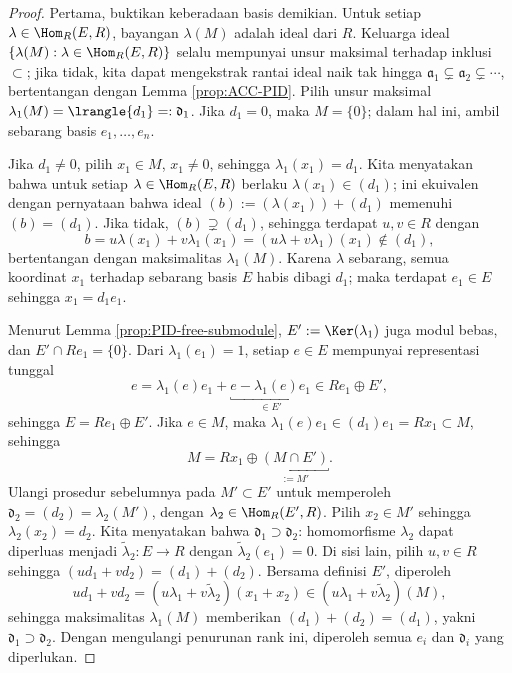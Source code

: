 \begin{proof}
	Pertama, buktikan keberadaan basis demikian. Untuk setiap $\lambda \in \Hom_R(E, R)$, bayangan $\lambda(M)$ adalah ideal dari $R$. Keluarga ideal $\{ \lambda(M): \lambda \in \Hom_R(E, R) \}$ selalu mempunyai unsur maksimal terhadap inklusi $\subset$; jika tidak, kita dapat mengekstrak rantai ideal naik tak hingga $\mathfrak{a}_1 \subsetneq \mathfrak{a}_2 \subsetneq \cdots$, bertentangan dengan Lemma \ref{prop:ACC-PID}. Pilih unsur maksimal $\lambda_1(M) = \lrangle{d_1} =: \mathfrak{d}_1$. Jika $d_1 = 0$, maka $M=\{0\}$; dalam hal ini, ambil sebarang basis $e_1, \ldots, e_n$.

	Jika $d_1 \neq 0$, pilih $x_1 \in M$, $x_1 \neq 0$, sehingga $\lambda_1(x_1) = d_1$. Kita menyatakan bahwa untuk setiap $\lambda \in \Hom_R(E, R)$ berlaku $\lambda(x_1) \in (d_1)$; ini ekuivalen dengan pernyataan bahwa ideal $(b) := (\lambda(x_1)) + (d_1)$ memenuhi $(b)=(d_1)$. Jika tidak, $(b) \supsetneq (d_1)$, sehingga terdapat $u, v \in R$ dengan
	\[ b = u\lambda(x_1) + v\lambda_1(x_1) = (u\lambda + v\lambda_1)(x_1) \notin (d_1), \]
	bertentangan dengan maksimalitas $\lambda_1(M)$. Karena $\lambda$ sebarang, semua koordinat $x_1$ terhadap sebarang basis $E$ habis dibagi $d_1$; maka terdapat $e_1 \in E$ sehingga $x_1 = d_1 e_1$.

	Menurut Lemma \ref{prop:PID-free-submodule}, $E' := \Ker(\lambda_1)$ juga modul bebas, dan $E' \cap Re_1 = \{0\}$. Dari $\lambda_1(e_1) = 1$, setiap $e \in E$ mempunyai representasi tunggal
	\[ e = \lambda_1(e) e_1 + \underbracket{e - \lambda_1(e)e_1}_{\in E'} \in R e_1 \oplus E', \]
	sehingga $E = R e_1 \oplus E'$. Jika $e \in M$, maka $\lambda_1(e) e_1 \in (d_1) e_1 = R x_1 \subset M$, sehingga
	\[ M = Rx_1 \oplus \underbracket{(M \cap E')}_{:= M'}. \]
	Ulangi prosedur sebelumnya pada $M' \subset E'$ untuk memperoleh $\mathfrak{d}_2 = (d_2) = \lambda_2(M')$, dengan $\lambda_2 \in \Hom_R(E', R)$. Pilih $x_2 \in M'$ sehingga $\lambda_2(x_2) = d_2$. Kita menyatakan bahwa $\mathfrak{d}_1 \supset \mathfrak{d}_2$: homomorfisme $\lambda_2$ dapat diperluas menjadi $\tilde{\lambda}_2: E \to R$ dengan $\tilde{\lambda}_2(e_1)=0$. Di sisi lain, pilih $u,v \in R$ sehingga $(ud_1 + vd_2) = (d_1) + (d_2)$. Bersama definisi $E'$, diperoleh
	\[ ud_1 + vd_2 = (u \lambda_1 + v\tilde{\lambda}_2)(x_1 + x_2) \in (u \lambda_1 + v\tilde{\lambda}_2)(M), \]
	sehingga maksimalitas $\lambda_1(M)$ memberikan $(d_1) + (d_2) = (d_1)$, yakni $\mathfrak{d}_1 \supset \mathfrak{d}_2$. Dengan mengulangi penurunan rank ini, diperoleh semua $e_i$ dan $\mathfrak{d}_i$ yang diperlukan.


\end{proof}
